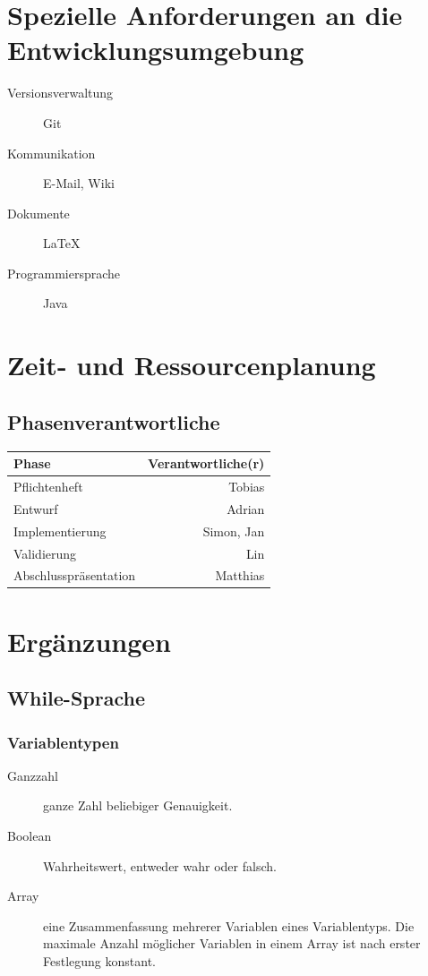 \documentclass[a4paper,10pt]{article}
\begin{document}
\section{Spezielle Anforderungen an die Entwicklungsumgebung}
\begin{description}
  \item[Versionsverwaltung] Git
  \item[Kommunikation] E-Mail, Wiki
  \item[Dokumente] \LaTeX
  \item[Programmiersprache] Java
\end{description}

\section{Zeit- und Ressourcenplanung}
\subsection{Phasenverantwortliche}
\begin{tabular}[h]{| l | r |}
\hline
\textbf{Phase} & \textbf{Verantwortliche(r)}\\
\hline
Pflichtenheft & Tobias\\
\hline
Entwurf & Adrian\\
\hline
Implementierung & Simon, Jan\\
\hline
Validierung & Lin\\
\hline
Abschlusspräsentation & Matthias\\
\hline
\end{tabular}


\section{Ergänzungen}
\subsection{While-Sprache}
\subsubsection{Variablentypen}
\begin{description}
\item[Ganzzahl] ganze Zahl beliebiger Genauigkeit.
\item[Boolean] Wahrheitswert, entweder wahr oder falsch.
\item[Array] eine Zusammenfassung mehrerer Variablen eines Variablentyps. Die maximale Anzahl möglicher Variablen in einem Array ist nach erster Festlegung konstant.
\end{description}
\end{document}

